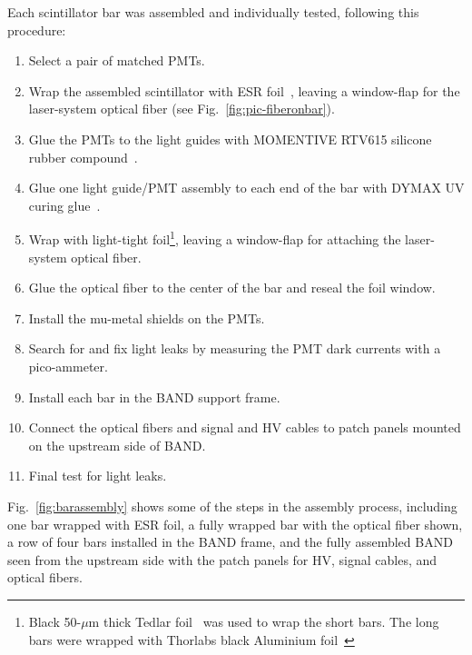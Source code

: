 \documentclass[review,number,sort&compress]{elsarticle}
\begin{document}
Each scintillator bar was assembled and individually tested, following this procedure:
\begin{enumerate}
\item Select a pair of matched PMTs.
\item Wrap the assembled scintillator with ESR foil~\cite{3MESR}, leaving a window-flap for the laser-system optical fiber (see Fig.~\ref{fig:pic-fiberonbar}).
\item Glue the PMTs to the light guides with MOMENTIVE RTV615 silicone rubber compound~\cite{softglue}.
\item Glue one light guide/PMT assembly to each end of the bar with DYMAX
  UV curing glue~\cite{uvglue}.
\item Wrap with light-tight foil\footnote{Black 50-$\mu$m thick Tedlar\textregistered{} foil~\cite{tedlarfoil} 
was used to wrap the short bars. The long bars were wrapped with Thorlabs black Aluminium foil~\cite{thorlabsfoil}}, leaving a
  window-flap for attaching the laser-system optical fiber.
\item Glue the optical fiber to the center of the bar and reseal the foil window.
\item Install the mu-metal shields on the PMTs.
\item Search for and fix light leaks by measuring the PMT dark currents with a pico-ammeter.
\item Install each bar in the BAND support frame.
\item Connect the optical fibers and signal and HV cables to patch panels mounted on the upstream side of BAND.
\item Final test for light leaks.
\end{enumerate}
Fig.~\ref{fig:barassembly} shows some of the steps in the assembly process,
including one bar wrapped with ESR foil, a fully wrapped bar with the
optical fiber shown, a row of four bars installed in the BAND frame,
and the fully assembled BAND seen from the upstream side with the
patch panels for HV, signal cables, and optical fibers.
\end{document}
